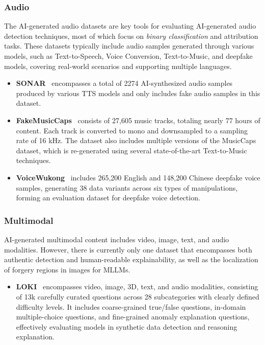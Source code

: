 \subsubsection{\textbf{Audio}}
The AI-generated audio datasets are key tools for evaluating AI-generated audio detection techniques, most of which focus on \textit{binary classification} and attribution tasks. These datasets typically include audio samples generated through various models, such as Text-to-Speech, Voice Conversion, Text-to-Music, and deepfake models, covering real-world scenarios and supporting multiple languages.
\begin{itemize}
    \item \textbf{SONAR}~\cite{li2024sonar} encompasses a total of 2274 AI-synthesized audio samples produced by various TTS models and only includes fake audio samples in this dataset.
    \item \textbf{FakeMusicCaps}~\cite{comanducci2024fakemusiccaps} consists of 27,605 music tracks, totaling nearly 77 hours of content. Each track is converted to mono and downsampled to a sampling rate of 16 kHz. The dataset also includes multiple versions of the MusicCaps~\cite{agostinelli2023musiclm} dataset, which is re-generated using several state-of-the-art Text-to-Music techniques.
    \item \textbf{VoiceWukong}~\cite{yan2024voicewukong} includes 265,200 English and 148,200 Chinese deepfake voice samples, generating 38 data variants across six types of manipulations, forming an evaluation dataset for deepfake voice detection.
\end{itemize}

\subsubsection{\textbf{Multimodal}}
AI-generated multimodal content includes video, image, text, and audio modalities. However, there is currently only one dataset that encompasses both authentic detection and human-readable explainability, as well as the localization of forgery regions in images for MLLMs.
\begin{itemize}
    \item \textbf{LOKI}~\cite{ye2024loki} encompasses video, image, 3D, text, and audio modalities, consisting of 13k carefully curated questions across 28 subcategories with clearly defined difficulty levels. It includes coarse-grained true/false questions, in-domain multiple-choice questions, and fine-grained anomaly explanation questions, effectively evaluating models in synthetic data detection and reasoning explanation.
\end{itemize}

